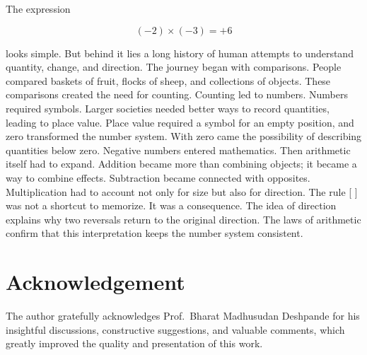 \documentclass[11pt]{article}
\begin{document}
The expression

\[
(-2)\times(-3)=+6
\]

looks simple. But behind it lies a long history of human attempts to understand quantity, change, and direction. The journey began with comparisons. People compared baskets of fruit, flocks of sheep, and collections of objects. These comparisons created the need for counting. Counting led to numbers. Numbers required symbols. Larger societies needed better ways to record quantities, leading to place value. Place value required a symbol for an empty position, and zero transformed the number system. With zero came the possibility of describing quantities below zero. Negative numbers entered mathematics. Then arithmetic itself had to expand. Addition became more than combining objects; it became a way to combine effects. Subtraction became connected with opposites. Multiplication had to account not only for size but also for direction. The rule
[
\boxed{(-)\times(-)=+}
]
was not a shortcut to memorize. It was a consequence. The idea of direction explains why two reversals return to the original direction. The laws of arithmetic confirm that this interpretation keeps the number system consistent. 

\section*{Acknowledgement}

The author gratefully acknowledges Prof.\ Bharat Madhusudan Deshpande for his insightful discussions, constructive suggestions, and valuable comments, which greatly improved the quality and presentation of this work.
\end{document}
